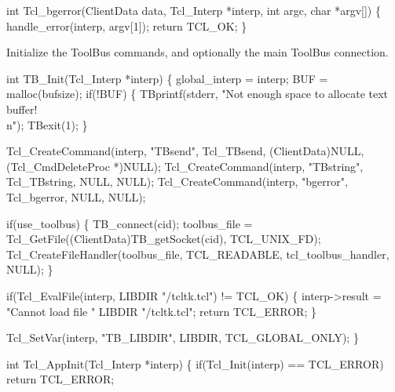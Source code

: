 
\nwenddocs{}\endmoddef\let\nwnotused=\nwoutput{}
int Tcl_bgerror(ClientData data, Tcl_Interp *interp, int argc, char *argv[])
\{
  handle_error(interp, argv[1]);
  return TCL_OK;
\}
\nwendcode{}\nwdocspar



Initialize the ToolBus commands, and optionally the main ToolBus
connection.

\nwenddocs{}\endmoddef\let\nwnotused=\nwoutput{}
int TB_Init(Tcl_Interp *interp)
\{
  global_interp = interp;
  BUF = malloc(bufsize);
  if(!BUF) \{
    TBprintf(stderr, "Not enough space to allocate text buffer!\\n");
    TBexit(1);
  \}

  Tcl_CreateCommand(interp, "TBsend", Tcl_TBsend, (ClientData)NULL, (Tcl_CmdDeleteProc *)NULL);
  Tcl_CreateCommand(interp, "TBstring", Tcl_TBstring, NULL, NULL);
  Tcl_CreateCommand(interp, "bgerror", Tcl_bgerror, NULL, NULL);

  if(use_toolbus) \{
    TB_connect(cid);
    toolbus_file = Tcl_GetFile((ClientData)TB_getSocket(cid), TCL_UNIX_FD);
    Tcl_CreateFileHandler(toolbus_file, TCL_READABLE, tcl_toolbus_handler, NULL);
  \}

  if(Tcl_EvalFile(interp, LIBDIR "/tcltk.tcl") != TCL_OK) \{
    interp->result = "Cannot load file " LIBDIR "/tcltk.tcl";
    return TCL_ERROR;
  \}

  Tcl_SetVar(interp, "TB_LIBDIR", LIBDIR, TCL_GLOBAL_ONLY);
\}
\nwendcode{}\nwdocspar



\nwenddocs{}\endmoddef\let\nwnotused=\nwoutput{}
int Tcl_AppInit(Tcl_Interp *interp)
\{
  if(Tcl_Init(interp) == TCL_ERROR)
    return TCL_ERROR;

